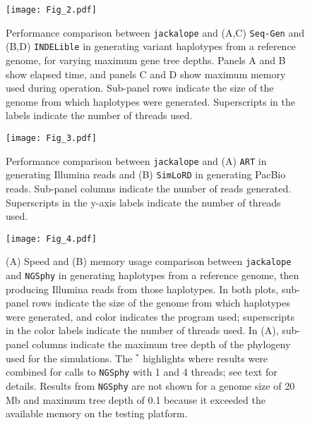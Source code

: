 \documentclass[12pt,]{article}
\begin{document}
\begin{figure}
\centering
\texttt{[image: Fig\_2.pdf]}
\caption{\label{fig:haplotypes-perf-test-plot}Performance comparison between \texttt{jackalope} and (A,C) \texttt{Seq-Gen} and (B,D) \texttt{INDELible} in generating variant haplotypes from a reference genome, for varying maximum gene tree depths. Panels A and B show elapsed time, and panels C and D show maximum memory used during operation. Sub-panel rows indicate the size of the genome from which haplotypes were generated. Superscripts in the labels indicate the number of threads used.}
\end{figure}

\begin{figure}
\centering
\texttt{[image: Fig\_3.pdf]}
\caption{\label{fig:sequencing-perf-test-plot}Performance comparison between \texttt{jackalope} and (A) \texttt{ART} in generating Illumina reads and (B) \texttt{SimLoRD} in generating PacBio reads. Sub-panel columns indicate the number of reads generated. Superscripts in the y-axis labels indicate the number of threads used.}
\end{figure}

\begin{figure}
\centering
\texttt{[image: Fig\_4.pdf]}
\caption{\label{fig:pipeline-perf-test-plot}(A) Speed and (B) memory usage comparison between \texttt{jackalope} and \texttt{NGSphy} in generating haplotypes from a reference genome, then producing Illumina reads from those haplotypes. In both plots, sub-panel rows indicate the size of the genome from which haplotypes were generated, and color indicates the program used; superscripts in the color labels indicate the number of threads used. In (A), sub-panel columns indicate the maximum tree depth of the phylogeny used for the simulations. The \({}^{*}\) highlights where results were combined for calls to \texttt{NGSphy} with 1 and 4 threads; see text for details. Results from \texttt{NGSphy} are not shown for a genome size of 20 Mb and maximum tree depth of 0.1 because it exceeded the available memory on the testing platform.}
\end{figure}
\end{document}
